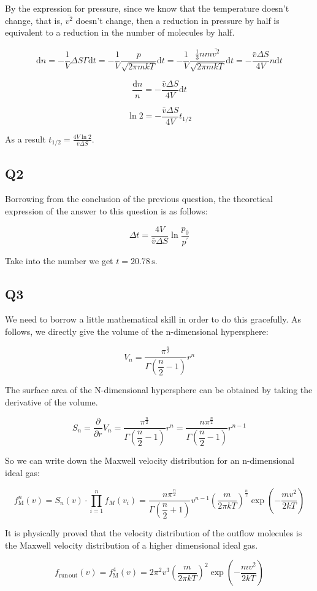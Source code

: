 \documentclass[a4paper,11pt]{amsart}
\theoremstyle{definition}
\begin{document}
	By the expression for pressure, since we know that the temperature doesn't change, that is, $\overline{v^2}$ doesn't change, then a reduction in pressure by half is equivalent to a reduction in the number of molecules by half.

	$$
	\mathrm{d}n=-\frac{1}{V}\Delta S\varGamma \mathrm{d}t=-\frac{1}{V}\frac{p}{\sqrt{2\pi mkT}}\mathrm{d}t=-\frac{1}{V}\frac{\frac{1}{3}nm\overline{v^2}}{\sqrt{2\pi mkT}}\mathrm{d}t=-\frac{\bar{v}\Delta S}{4V}n\mathrm{d}t
	$$

	$$
	\frac{\mathrm{d}n}{n}=-\frac{\bar{v}\Delta S}{4V}\mathrm{d}t
	$$

	$$
	\ln 2=-\frac{\bar{v}\Delta S}{4V}t_{1/2}
	$$

	As a result $\displaystyle t_{1/2}=\frac{4V\ln 2}{\bar{v}\Delta S}$.

	\subsection*{Q2}

	Borrowing from the conclusion of the previous question, the theoretical expression of the answer to this question is as follows:

	$$
	\Delta t=\frac{4V}{\bar{v}\Delta S}\ln \frac{p_0}{p^{\prime}}
	$$

	Take into the number we get $t=20.78\,\mathrm{s}$.

	\subsection*{Q3}

	We need to borrow a little mathematical skill in order to do this gracefully. As follows, we directly give the volume of the n-dimensional hypersphere:

	$$
	V_n=\frac{\pi ^{\tfrac{n}{2}}}{\Gamma \left( \dfrac{n}{2}-1 \right)}r^n
	$$

	The surface area of the N-dimensional hypersphere can be obtained by taking the derivative of the volume.

	$$
	S_n=\frac{\partial}{\partial r}V_n=\frac{\pi ^{\tfrac{n}{2}}}{\Gamma \left( \dfrac{n}{2}-1 \right)}r^n=\frac{n\pi ^{\tfrac{n}{2}}}{\Gamma \left( \dfrac{n}{2}-1 \right)}r^{n-1}
	$$

	So we can write down the Maxwell velocity distribution for an n-dimensional ideal gas:

	$$
	f_{\mathrm{M}}^{n}\left( v \right) =S_n\left( v \right) \cdot \prod_{i=1}^n{f_M\left( v_i \right)}=\frac{n\pi ^{\tfrac{n}{2}}}{\Gamma \left( \dfrac{n}{2}+1 \right)}v^{n-1}\left( \frac{m}{2\pi kT} \right) ^{\tfrac{n}{2}}\exp \left( -\frac{mv^2}{2kT} \right) 
	$$

	It is physically proved that the velocity distribution of the outflow molecules is the Maxwell velocity distribution of a higher dimensional ideal gas.

	$$
	f_{\mathrm{run}\,\mathrm{out}}\left( v \right) =f_{\mathrm{M}}^{4}\left( v \right) =2\pi ^2v^3\left( \frac{m}{2\pi kT} \right) ^2\exp \left( -\frac{mv^2}{2kT} \right) 
	$$

	
\end{document}
